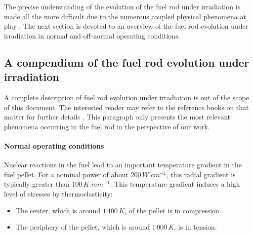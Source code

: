 The precise understanding of the evolution of the fuel rod under
irradiation is made all the more difficult due to the numerous coupled
physical phenomena at play \cite{van_uffelen_3.19_2012}. The next section is
devoted to an overview of the fuel rod evolution under irradiation in
normal and off-normal operating conditions.

\subsection{A compendium of the fuel rod evolution under irradiation}

A complete description of fuel rod evolution under irradiation is out of
the scope of this document. The interested reader may refer to the
reference books on that matter for further details
\cite{bailly_nuclear_1999, cea_nuclear_2009}. This paragraph only presents
the most relevant phenomena occurring in the fuel rod in the perspective
of our work.

\paragraph{Normal operating conditions}
\label{sec:hho:normal_operating_conditions}

Nuclear reactions in the fuel lead to an important temperature gradient
in the fuel pellet. For a nominal power of about \(200\,W.cm^{-1}\),
this radial gradient is typically greater than \(100\,K.mm^{-1}\). This
temperature gradient induces a high level of stresses by
thermoelasticity:

\begin{itemize}
    \item The center, which is around \(1\,400\, K\), of the pellet is in
    compression.
    \item The periphery of the pellet, which is around \(1\,000\,K\), is in
    tension.
\end{itemize}


